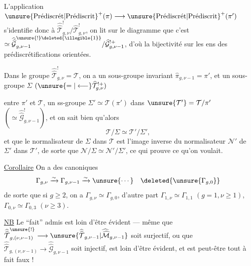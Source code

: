 L'application $\unsure{\text{Prédiscrét}|\text{Prédiscrit}}^{+}(\pi)\longrightarrow
\unsure{\text{Prédiscrét}|\text{Prédiscrit}}^{+}(\pi')$ s'identifie donc à
$\widehat{\widehat{\mathcal T}}_{g,\nu}^{!}/\widehat{\mathcal T}_{g,\nu}^{!}$,
on lit sur le diagramme que c'est
$\simeq\widehat{\widehat{\mathcal G}}_{g,\nu-1}^{\unsure{!}\deleted{\illegible{1}}}/
\widehat{\mathcal G}_{g,\nu-1}^{!+}$,
d'où la bijectivité sur les ens des prédiscrétifications orientées.

Dans le groupe $\widehat{\widehat{\mathcal T}}_{g,\nu}^{!}=\mathcal T$,
on a un sous-groupe invariant $\widehat{\pi}_{g,\nu-1}=\pi'$,
et un sous-groupe $\Sigma$ $(\unsure{=|\longleftarrow}\widehat{\mathcal T}_{g,\nu}^{!+})$


entre $\pi'$ et $\mathcal T$,   un ss-groupe $\Sigma'\simeq\mathcal T(\pi')$ dans $\unsure{\mathcal T'}=\mathcal T/\pi'$ $(\simeq\widehat{\widehat{\mathcal G}}^{!}_{g,\nu-1})$, et on sait bien qu'alors
\[
\mathcal T/\Sigma\simeq\mathcal T'/\Sigma',
\]
et  que le normalisateur  de $\Sigma$ dans $\mathcal T$ est l'image inverse du normalisateur $\mathcal N'$ de $\Sigma'$ dans $\mathcal T'$, de sorte que $\mathcal N/\Sigma\simeq\mathcal N'/\Sigma'$, ce qui prouve ce qu'on voulait.

\uline{Corollaire} On a des  canoniques
\[
\Gamma_{g,\nu}\xrightarrow{\sim}\Gamma_{g,\nu-1}\xrightarrow{\sim}\unsure{\cdots}\quad\deleted{\unsure{\Gamma_{g,0}}}
\]
de sorte que si $g\geq2$, on a  $\Gamma_{g,\nu}\simeq\Gamma_{g,0}$, d'autre part $\Gamma_{1,\nu}\simeq\Gamma_{1,1}$ $(g=1,\nu\geq1)$, $\Gamma_{0,\nu}\simeq\Gamma_{0,3}$ $(\nu\geq3)$.

\uline{NB} Le ``fait''  admis est loin d'être évident --- même que $\widehat{\widehat{\mathcal T}}^{\unsure{!}}_{g,(\nu,\nu-1)}\longrightarrow\unsure{\widehat{\widehat{\mathcal T}}_{g,\nu-1}|\widehat{\widehat{\mathcal M}}_{g,\nu-1}}$ soit surjectif, ou que $\widehat{\widehat{\mathcal T}}_{g,(\nu,\nu-1)}\longrightarrow\widehat{\widehat{\mathcal G}}_{g,\nu-1}$ soit injectif, est loin d'être évident, et est peut-être tout à fait faux !

